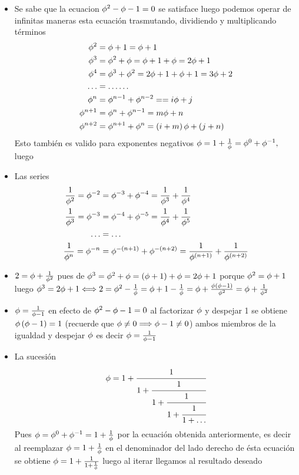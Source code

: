 \begin{itemize}
	\item  Se sabe que la ecuacion $\phi^2-\phi-1=0$ se satisface luego podemos operar de infinitas maneras  esta ecuación trasmutando, dividiendo y multiplicando términos \begin{align*}
		\phi^2&=\phi+1=\phi+1\\
		\phi^3&=\phi^2+\phi=\phi+1+\phi=2\phi+1\\
		\phi^4&=\phi^3+\phi^2=2\phi+1+\phi+1=3\phi+2\\
		\ldots &=\ldots\ldots\\
		\phi^n&=\phi^{n-1}+\phi^{n-2}==i\phi+j\\
		\phi^{n+1}&=\phi^{n}+\phi^{n-1}=m\phi+n\\
		\phi^{n+2}&=\phi^{n+1}+\phi^{n}=\left(i+m\right)\phi+\left(j+n\right)
	\end{align*}
	Esto también es valido para exponentes negativos $\phi=1+\frac{1}{\phi}=\phi^0+\phi^{-1},$  luego

	\item Las series \begin{align*}
		\frac{1}{\phi^{2}}=\phi^{-2}&=\phi^{-3}+\phi^{-4}=\frac{1}{\phi^{3}}+\frac{1}{\phi^{4}}\\
		\frac{1}{\phi^{3}}=\phi^{-3}&=\phi^{-4}+\phi^{-5}=\frac{1}{\phi^{4}}+\frac{1}{\phi^{5}}\\
		\ldots&=\ldots\\
		\frac{1}{\phi^{n}}=\phi^{-n}&=\phi^{-\left(n+1\right)}+\phi^{-\left(n+2\right)}=\frac{1}{\phi^{\left(n+1\right)}}+\frac{1}{\phi^{\left(n+2\right)}}\\
	\end{align*}

	\item $2=\phi+\frac{1}{\phi^2}$ pues de $\phi^{3}=\phi^{2}+\phi=\left(\phi+1\right)+\phi=2\phi+1$ porque $\phi^{2}=\phi+1$ luego $\phi^{3}=2\phi+1\Longleftrightarrow 2=\phi^2-\frac{1}{\phi}=\phi+1-\frac{1}{\phi}=\phi+\frac{\phi\left(\phi-1\right)}{\phi^2}=\phi+\frac{1}{\phi^2}$

	\item $\phi=\frac{1}{\phi-1}$ en efecto de $\phi^2-\phi-1=0$ al factorizar $\phi$ y despejar 1 se obtiene $\phi\left(\phi-1\right)=1$ (recuerde que $\phi\neq 0\Longrightarrow \phi-1\neq 0$) ambos miembros de la igualdad y despejar $\phi$ es decir $\phi=\frac{1}{\phi-1}$


	\item La sucesión $$\phi=1+\cfrac{1}{1+\cfrac{1}{1+\cfrac{1}{1+\cfrac{1}{1+\ldots}}}}$$
	Pues $\phi={\phi}^0+{\phi}^{-1}=1+\frac{1}{\phi}$ por la ecuación obtenida anteriormente, es decir al reemplazar $\phi=1+\frac{1}{\phi}$ en el denominador del lado derecho de ésta ecuación se obtiene $\phi=1+\frac{1}{1+\frac{1}{\phi}}$ luego al iterar llegamos al resultado deseado
\end{itemize}


